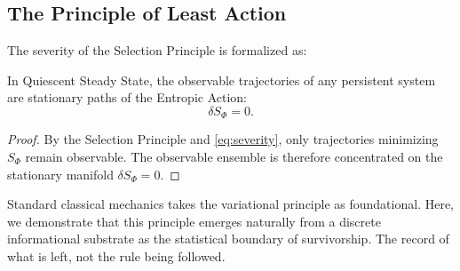 \subsection{The Principle of Least Action}
\label{subsec:least_action}
The severity of the Selection Principle is formalized as:

\begin{proposition}
In Quiescent Steady State, the observable trajectories of any persistent system are stationary paths of the Entropic Action:
\begin{equation}
    \delta S_\Phi = 0.
\end{equation}
\end{proposition}

\begin{proof}
By the Selection Principle and \cref{eq:severity}, only trajectories minimizing $S_\Phi$ remain observable. The observable ensemble is therefore concentrated on the stationary manifold $\delta S_\Phi = 0$.
\end{proof}

Standard classical mechanics takes the variational principle as foundational. Here, we demonstrate that this principle emerges naturally from a discrete informational substrate as the statistical boundary of survivorship. The record of what is left, not the rule being followed.